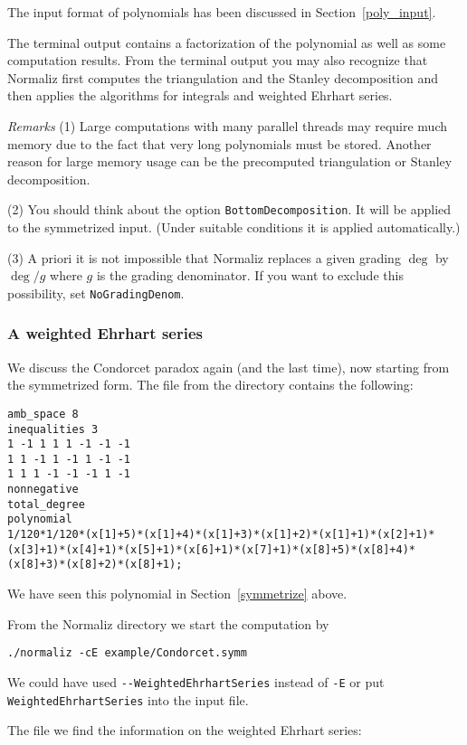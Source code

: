 The input format of polynomials has been discussed in Section~\ref{poly_input}.

The terminal output contains a factorization of the polynomial as well as some computation results. From the terminal output you may also recognize that Normaliz first computes the triangulation and the Stanley decomposition and then applies the algorithms for integrals and weighted Ehrhart series.

\emph{Remarks} \enspace (1) Large computations with many parallel threads may require much memory due to the fact that very long polynomials must be stored. Another reason for large memory usage can be the precomputed triangulation or Stanley decomposition.

(2) You should think about the option \verb|BottomDecomposition|. It will be applied to the symmetrized input. (Under suitable conditions it is applied automatically.)

(3) A priori it is not impossible that Normaliz replaces a given grading $\deg$ by $\deg/g$ where $g$ is the grading denominator. If you want to exclude this possibility, set \verb|NoGradingDenom|.


\subsubsection{A weighted Ehrhart series}

We discuss the Condorcet paradox again (and the last time), now starting from the symmetrized form. The file  from the directory
 contains the following:

\begin{Verbatim}
amb_space 8
inequalities 3
1 -1 1 1 1 -1 -1 -1
1 1 -1 1 -1 1 -1 -1
1 1 1 -1 -1 -1 1 -1
nonnegative
total_degree
polynomial
1/120*1/120*(x[1]+5)*(x[1]+4)*(x[1]+3)*(x[1]+2)*(x[1]+1)*(x[2]+1)*
(x[3]+1)*(x[4]+1)*(x[5]+1)*(x[6]+1)*(x[7]+1)*(x[8]+5)*(x[8]+4)*
(x[8]+3)*(x[8]+2)*(x[8]+1);
\end{Verbatim}
We have seen this polynomial in Section~\ref{symmetrize} above.


From the Normaliz directory we start the computation by
\begin{Verbatim}
./normaliz -cE example/Condorcet.symm
\end{Verbatim}
We could have used \verb|--WeightedEhrhartSeries| instead of \verb|-E| or put \verb|WeightedEhrhartSeries| into the input file.

The file  we find the information on the weighted Ehrhart series:

